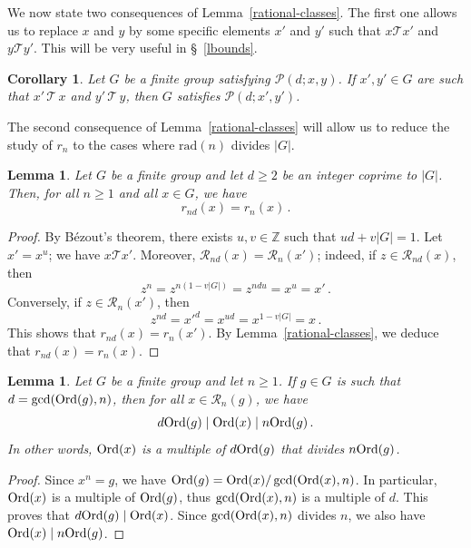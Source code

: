\documentclass[12pt]{amsart}
\numberwithin{equation}{section}
\newcommand{\Ord}{{\rm Ord}}
\newcommand{\Z}{\mathbb Z}
\newtheorem{cor}[X]{Corollary}
\newtheorem{lem}[X]{Lemma}
\theoremstyle{definition}
\theoremstyle{remark}
\begin{document}
We now state two consequences of Lemma~\ref{rational-classes}. The first one allows us to replace $x$ and $y$ by some specific elements $x'$ and $y'$ such that $x\mathcal{T}x'$ and $y\mathcal{T}y'$. This will be very useful in \S~\ref{lbounds}.
\begin{cor}\label{invarianceofpropertyP}
    Let $G$ be a finite group satisfying $\mathcal{P}(d;x,y)$. If $x',y'\in G$ are such that $x'\, \mathcal{T}\,x$ and $y'\,\mathcal{T}\, y$, then $G$ satisfies $\mathcal{P}(d;x',y')$.
\end{cor}
The second consequence of Lemma~\ref{rational-classes} will allow us to reduce the study of $r_n$ to the cases where $\mathrm{rad}(n)$ divides $|G|$.
\begin{lem}\label{rnd=rn}
    Let $G$ be a finite group and let $d\ge 2$ be an integer coprime to $|G|$. Then, for all $n\ge 1$ and all $x\in G$, we have \[r_{nd}(x)=r_n(x)\, .\]
\end{lem}
\begin{proof}
    By Bézout's theorem, there exists $u,v\in \Z$ such that $ud+v|G|=1$. Let $x'=x^u$; we have $x\mathcal{T}x'$. Moreover, $\mathcal{R}_{nd}(x)=\mathcal{R}_{n}(x')$; indeed, if $z\in \mathcal{R}_{nd}(x)$, then \[z^n=z^{n(1-v|G|)}=z^{ndu}=x^u=x'\, .\]
    Conversely, if $z\in \mathcal{R}_{n}(x')$, then \[z^{nd}=x'^d=x^{ud}=x^{1-v|G|}=x\, .\]
    This shows that $r_{nd}(x)=r_n(x')$. By Lemma~\ref{rational-classes}, we deduce that $r_{nd}(x)=r_n(x)$.
\end{proof}


\begin{lem}\label{rootorder}
    Let $G$ be a finite group and let $n\ge 1$. If $g\in G$ is such that $d=\gcd(\Ord(g),n)$, then for all $x\in \mathcal{R}_n(g)$, we have \[ d\Ord(g) \mid \Ord(x)\mid n\Ord(g)\, .\]
    In other words, $\Ord(x)$ is a multiple of $d\Ord(g)$ that divides $n\Ord(g)$.
\end{lem}
\begin{proof}
    Since $x^n=g$, we have $\Ord(g)=\Ord(x)/\gcd(\Ord(x),n)$. In particular, $\Ord(x)$ is a multiple of $\Ord(g)$, thus $\gcd(\Ord(x),n)$ is a multiple of $d$. This proves that $d\Ord(g)\mid \Ord(x)$. Since $\gcd(\Ord(x),n)$ divides $n$, we also have $\Ord(x)\mid n\Ord(g)$.
\end{proof}
\end{document}
